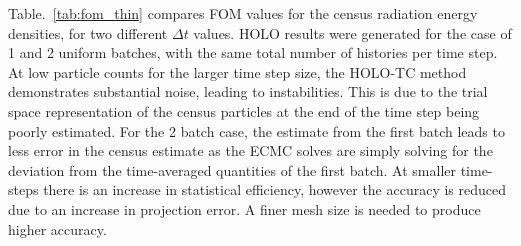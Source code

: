 \documentclass{anstrans}
\renewcommand{\ss}{\ensuremath{\|s\|}}
\begin{document}
Table.~\ref{tab:fom_thin} compares FOM values for the census
radiation energy densities, for two different $\Delta t$ values.  HOLO results were
generated for the case of 1 and 2 uniform batches, with the same
total number of histories per time step.  At low particle counts for the larger time step
size, the HOLO-TC method
demonstrates substantial noise, leading to instabilities.  This is due to the trial space representation of the
census particles at the end of the time step being poorly estimated.  For the 2 batch
case, the estimate from the first batch leads to less error in the census estimate as the
ECMC solves are simply solving for the deviation from the time-averaged quantities of the first
batch.   At smaller time-steps there
is an increase in statistical efficiency, however the accuracy is reduced due to an
increase in projection error. A finer mesh size is needed to produce higher accuracy.

\end{document}
